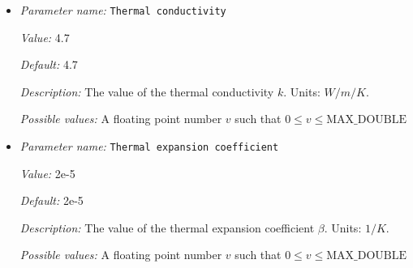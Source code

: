 \begin{itemize}
{\it Value:} 1e22


{\it Default:} 1e22


{\it Description:} The reference viscosity that is used for pressure scaling. To understand how pressure scaling works, take a look at \cite{KHB12}. In particular, the value of this parameter would not affect the solution computed by \aspect{} if we could do arithmetic exactly; however, computers do arithmetic in finite precision, and consequently we need to scale quantities in ways so that their magnitudes are roughly the same. As explained in \cite{KHB12}, we scale the pressure during some computations (never visible by users) by a factor that involves a reference viscosity. This parameter describes this reference viscosity.

For problems with a constant viscosity, you will generally want to choose the reference viscosity equal to the actual viscosity. For problems with a variable viscosity, the reference viscosity should be a value that adequately represents the order of magnitude of the viscosities that appear, such as an average value or the value one would use to compute a Rayleigh number.

Units: $Pa \, s$


{\it Possible values:} A floating point number $v$ such that $0 \leq v \leq \text{MAX\_DOUBLE}$
\item {\it Parameter name:} {\tt Thermal conductivity}
\label{parameters:Material model/Drucker Prager/Thermal conductivity}
\label{parameters:Material_20model/Drucker_20Prager/Thermal_20conductivity}


{\it Value:} 4.7


{\it Default:} 4.7


{\it Description:} The value of the thermal conductivity $k$. Units: $W/m/K$.


{\it Possible values:} A floating point number $v$ such that $0 \leq v \leq \text{MAX\_DOUBLE}$
\item {\it Parameter name:} {\tt Thermal expansion coefficient}
\label{parameters:Material model/Drucker Prager/Thermal expansion coefficient}
\label{parameters:Material_20model/Drucker_20Prager/Thermal_20expansion_20coefficient}


{\it Value:} 2e-5


{\it Default:} 2e-5


{\it Description:} The value of the thermal expansion coefficient $\beta$. Units: $1/K$.


{\it Possible values:} A floating point number $v$ such that $0 \leq v \leq \text{MAX\_DOUBLE}$
\end{itemize}



